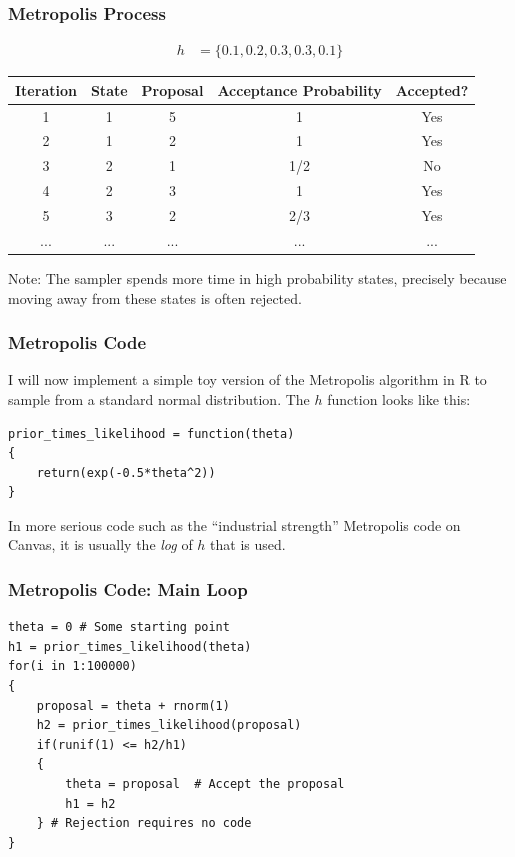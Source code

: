 \documentclass{beamer}
\begin{document}
\begin{frame}
\frametitle{Metropolis Process}
\begin{center}
\begin{align}
h &= \{ 0.1, 0.2, 0.3, 0.3, 0.1 \}
\end{align}
{\tiny
\begin{tabular}{|c|c|c|c|c|}
\hline
Iteration & State & Proposal & Acceptance Probability & Accepted? \\
\hline 
1         & 1     & 5        & 1                      & Yes \\
2         & 1     & 2        & 1                      & Yes \\
3         & 2     & 1        & 1/2                    & No \\
4         & 2     & 3        & 1                      & Yes \\
5         & 3     & 2        & 2/3                    & Yes \\
... & ... & ... & ... & ...  \\
\hline
\end{tabular}
} %
\end{center}
\pause

Note: The sampler spends more time in high probability states, precisely
because moving away from these states is often rejected.
\end{frame}


\begin{frame}[fragile]
\frametitle{Metropolis Code}

I will now implement a simple toy version of the Metropolis algorithm in R
to sample from a standard normal distribution. The $h$ function looks like this:

\begin{verbatim}
prior_times_likelihood = function(theta)
{
    return(exp(-0.5*theta^2))
}
\end{verbatim}
\pause

In more serious code such as the ``industrial strength'' Metropolis code on
Canvas, it is usually the {\em log} of $h$ that is used.
\end{frame}



\begin{frame}[fragile]
\frametitle{Metropolis Code: Main Loop}

\small
\begin{verbatim}
theta = 0 # Some starting point
h1 = prior_times_likelihood(theta)
for(i in 1:100000)
{
    proposal = theta + rnorm(1)
    h2 = prior_times_likelihood(proposal)
    if(runif(1) <= h2/h1)
    {
        theta = proposal  # Accept the proposal
        h1 = h2
    } # Rejection requires no code
}
\end{verbatim}

\end{frame}
\end{document}
